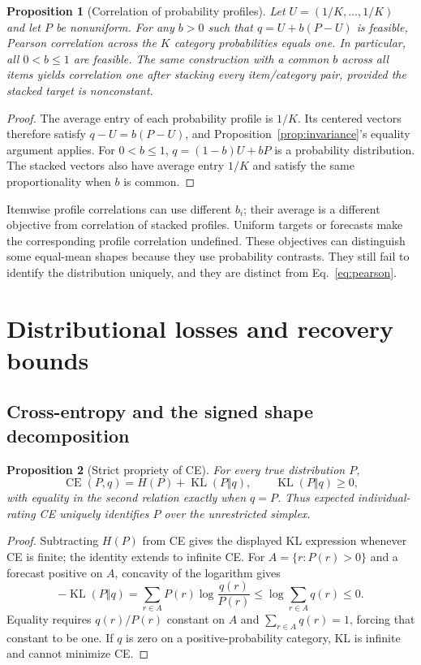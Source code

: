 \documentclass[11pt,letterpaper]{article}
\newtheorem{proposition}{Proposition}
\newcommand{\CE}{\operatorname{CE}}
\newcommand{\KL}{\operatorname{KL}}
\begin{document}
\begin{proposition}[Correlation of probability profiles]\label{prop:profiles}
Let $U=(1/K,\ldots,1/K)$ and let $P$ be nonuniform.
For any $b>0$ such that $q=U+b(P-U)$ is feasible, Pearson correlation across the $K$ category probabilities equals one.
In particular, all $0<b\le1$ are feasible.
The same construction with a common $b$ across all items yields correlation one after stacking every item/category pair, provided the stacked target is nonconstant.
\end{proposition}
\begin{proof}
The average entry of each probability profile is $1/K$.
Its centered vectors therefore satisfy $q-U=b(P-U)$, and Proposition~\ref{prop:invariance}'s equality argument applies.
For $0<b\le1$, $q=(1-b)U+bP$ is a probability distribution.
The stacked vectors also have average entry $1/K$ and satisfy the same proportionality when $b$ is common.
\end{proof}

Itemwise profile correlations can use different $b_i$; their average is a different objective from correlation of stacked profiles.
Uniform targets or forecasts make the corresponding profile correlation undefined.
These objectives can distinguish some equal-mean shapes because they use probability contrasts.
They still fail to identify the distribution uniquely, and they are distinct from Eq.~\eqref{eq:pearson}.

\section{Distributional losses and recovery bounds}
\subsection{Cross-entropy and the signed shape decomposition}
\begin{proposition}[Strict propriety of CE]\label{prop:ce}
For every true distribution $P$,
\[
 \CE(P,q)=H(P)+\KL(P\Vert q),\qquad \KL(P\Vert q)\ge0,
\]
with equality in the second relation exactly when $q=P$.
Thus expected individual-rating CE uniquely identifies $P$ over the unrestricted simplex.
\end{proposition}
\begin{proof}
Subtracting $H(P)$ from CE gives the displayed KL expression whenever CE is finite; the identity extends to infinite CE.
For $A=\{r:P(r)>0\}$ and a forecast positive on $A$, concavity of the logarithm gives
\[
 -\KL(P\Vert q)=\sum_{r\in A}P(r)\log\frac{q(r)}{P(r)}
 \le\log\sum_{r\in A}q(r)\le0.
\]
Equality requires $q(r)/P(r)$ constant on $A$ and $\sum_{r\in A}q(r)=1$, forcing that constant to be one.
If $q$ is zero on a positive-probability category, KL is infinite and cannot minimize CE.
\end{proof}
\end{document}
